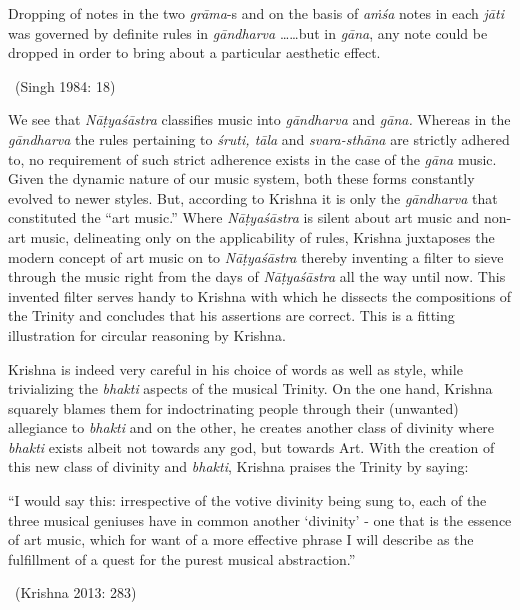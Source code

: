 \begin{myquote}
Dropping of notes in the two \textit{grāma}-s and on the basis of \textit{aṁśa} notes in each \textit{jāti} was governed by definite rules in \textit{gāndharva} ……but in \textit{gāna}, any note could be dropped in order to bring about a particular aesthetic effect. 

\vspace{-.3cm}

~\hfill (Singh 1984: 18)
\end{myquote}

We see that \textit{Nāṭyaśāstra} classifies music into \textit{gāndharva} and \textit{gāna.} Whereas in the \textit{gāndharva} the rules pertaining to \textit{śruti, tāla} and \textit{svara-sthāna} are strictly adhered to, no requirement of such strict adherence exists in the case of the \textit{gāna} music. Given the dynamic nature of our music system, both these forms constantly evolved to newer styles. But, according to Krishna it is only the \textit{gāndharva} that constituted the “art music.” Where \textit{Nāṭyaśāstra} is silent about art music and non-art music, delineating only on the applicability of rules, Krishna juxtaposes the modern concept of art music on to \textit{Nāṭyaśāstra} thereby inventing a filter to sieve through the music right from the days of \textit{Nāṭyaśāstra} all the way until now. This invented filter serves handy to Krishna with which he dissects the compositions of the Trinity and concludes that his assertions are correct. This is a fitting illustration for circular reasoning by Krishna.

Krishna is indeed very careful in his choice of words as well as style, while trivializing the \textit{bhakti} aspects of the musical Trinity. On the one hand, Krishna squarely blames them for indoctrinating people through their (unwanted) allegiance to \textit{bhakti} and on the other, he creates another class of divinity where \textit{bhakti} exists albeit not towards any god, but towards Art. With the creation of this new class of divinity and \textit{bhakti}, Krishna praises the Trinity by saying:

\begin{myquote}
“I would say this: irrespective of the votive divinity being sung to, each of the three musical geniuses have in common another ‘divinity’ - one that is the essence of art music, which for want of a more effective phrase I will describe as the fulfillment of a quest for the purest musical abstraction.” 

~\hfill (Krishna 2013: 283)
\end{myquote}

